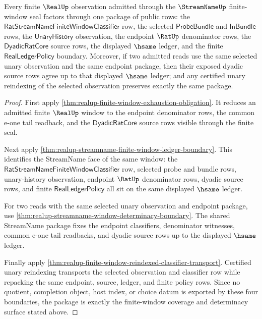\begin{theorem}
\label{thm:realup-finite-window-coverage-determinacy-package}
Every finite $\RealUp$ observation admitted through the $\StreamNameUp$
finite-window seal factors through one package of public rows: the
$\mathsf{RatStreamNameFiniteWindowClassifier}$ row, the selected
$\mathsf{ProbeBundle}$ and $\mathsf{InBundle}$ rows, the
$\mathsf{UnaryHistory}$ observation, the endpoint $\RatUp$ denominator rows,
the $\mathsf{DyadicRatCore}$ source rows, the displayed $\hsame$ ledger, and
the finite $\mathsf{RealLedgerPolicy}$ boundary. Moreover, if two admitted
reads use the same selected unary observation and the same endpoint package,
then their exposed dyadic source rows agree up to that displayed $\hsame$
ledger; and any certified unary reindexing of the selected observation
preserves exactly the same package.
\end{theorem}
\begin{proof}
First apply \autoref{thm:realup-finite-window-exhaustion-obligation}. It
reduces an admitted finite $\RealUp$ window to the endpoint denominator rows,
the common e-one tail readback, and the $\mathsf{DyadicRatCore}$ source rows
visible through the finite seal.

Next apply \autoref{thm:realup-streamname-finite-window-ledger-boundary}. This
identifies the StreamName face of the same window: the
$\mathsf{RatStreamNameFiniteWindowClassifier}$ row, selected probe and bundle
rows, unary-history observation, endpoint $\RatUp$ denominator rows, dyadic
source rows, and finite $\mathsf{RealLedgerPolicy}$ all sit on the same
displayed $\hsame$ ledger.

For two reads with the same selected unary observation and endpoint package,
use \autoref{thm:realup-streamname-window-determinacy-boundary}. The shared
StreamName package fixes the endpoint classifiers, denominator witnesses,
common e-one tail readbacks, and dyadic source rows up to the displayed
$\hsame$ ledger.

Finally apply
\autoref{thm:realup-finite-window-reindexed-classifier-transport}. Certified
unary reindexing transports the selected observation and classifier row while
repacking the same endpoint, source, ledger, and finite policy rows. Since no
quotient, completion object, host index, or choice datum is exported by these
four boundaries, the package is exactly the finite-window coverage and
determinacy surface stated above.
\end{proof}

